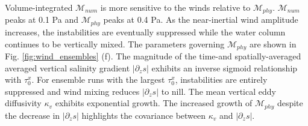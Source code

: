 Volume-integrated $\mathcal{M}_{num}$ is more sensitive to the winds relative to $\mathcal{M}_{phy}$. $\mathcal{M}_{num}$ peaks at 0.1 Pa and $\mathcal{M}_{phy}$ peaks at 0.4 Pa. As the near-inertial wind amplitude increases, the instabilities are eventually suppressed while the water column continues to be vertically mixed. The parameters governing $\mathcal{M}_{phy}$ are shown in Fig. \ref{fig:wind_ensembles} (f). The magnitude of the time-and spatially-averaged averaged vertical salinity gradient $|\partial_z s|$ exhibits an inverse sigmoid relationship with $\tau_0^x$. For ensemble runs with the largest $\tau_0^x$, instabilities are entirely suppressed and wind mixing reduces $|\partial_z s|$ to nill. The mean vertical eddy diffusivity $\kappa_v$ exhibits exponential growth. The increased growth of $\mathcal{M}_{phy}$ despite the decrease in $|\partial_z s|$ highlights the covariance between $\kappa_v$ and $|\partial_z s|$. 




